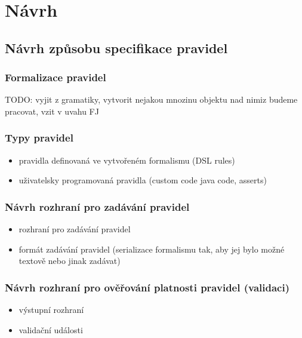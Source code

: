 \chapter{Návrh}

\section{Návrh způsobu specifikace pravidel}

\subsection{Formalizace pravidel}

TODO: vyjit z gramatiky, vytvorit nejakou mnozinu objektu nad nimiz budeme pracovat, vzit v uvahu FJ

\subsection{Typy pravidel}
\begin{itemize}
\item pravidla definovaná ve vytvořeném formalismu (DSL rules)
\item uživatelsky programovaná pravidla (custom code java code, asserts)
\end{itemize}

\subsection{Návrh rozhraní pro zadávání pravidel}
\begin{itemize}
\item rozhraní pro zadávání pravidel
\item formát zadávání pravidel (serializace formalismu tak, aby jej bylo možné textově nebo jinak zadávat)
\end{itemize}

\subsection{Návrh rozhraní pro ověřování platnosti pravidel (validaci)}
\begin{itemize}
\item výstupní rozhraní
\item validační události
\end{itemize}

